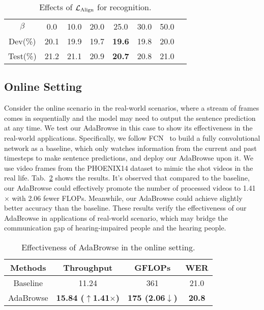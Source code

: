 \documentclass[sigconf]{acmart}
\begin{document}
  \begin{table}[t]   
    \centering      
    \caption{Effects of $\mathcal{L}_{{\rm Align}}$ for recognition.}
    \begin{tabular}{cccccccc}
    \hline
    $\beta$  & 0.0 & 10.0 & 20.0 & 25.0 & 30.0 & 50.0\\
    Dev(\%) & 20.1 & 19.9 &  19.7 & \textbf{19.6} & 19.8 & 20.0  \\
    Test(\%) & 21.2 & 21.1 & 20.9 & \textbf{20.7} & 20.8 & 21.0 \\
    \hline
    \end{tabular}
    \label{tab10}
    \vspace{-7px}
\end{table}

\subsection{Online Setting}
Consider the online scenario in the real-world scenarios, where a stream of frames comes in sequentially and the model may need to
output the sentence prediction at any time. We test our AdaBrowse in this case to show its effectiveness in the real-world applications. Specifically, we follow FCN~\cite{cheng2020fully} to build a fully convolutional network as a baseline, which only watches information from the current and past timesteps to make sentence predictions, and deploy our AdaBrowse upon it. We use video frames from the PHOENIX14 dataset to mimic the shot videos in the real life. Tab.~\ref{tab_online} shows the results. It's observed that compared to the baseline, our AdaBrowse could effectively promote the number of processed videos to 1.41$\times$ with 2.06 fewer FLOPs. Meanwhile, our AdaBrowse could achieve slightly better accuracy than the baseline. These results verify the effectiveness of our AdaBrowse in applications of real-world scenario, which may bridge the communication gap of hearing-impaired people and the hearing people.

\begin{table}[t]
  \setlength\tabcolsep{3pt}
  \caption{Effectiveness of AdaBrowse in the online setting. }
  \label{tab_online}
  \centering
  \begin{tabular}{cccc}
  \hline
  Methods  & Throughput & GFLOPs & WER  \\
  \hline
  Baseline	& 11.24	& 361	& 21.0	 \\
  AdaBrowse & \textbf{15.84 ($\uparrow$1.41$\times$)} &  \textbf{175 (2.06$\downarrow$)}      &\textbf{20.8} \\
\hline
\end{tabular}
\vspace{-7px}
\end{table}
\end{document}

